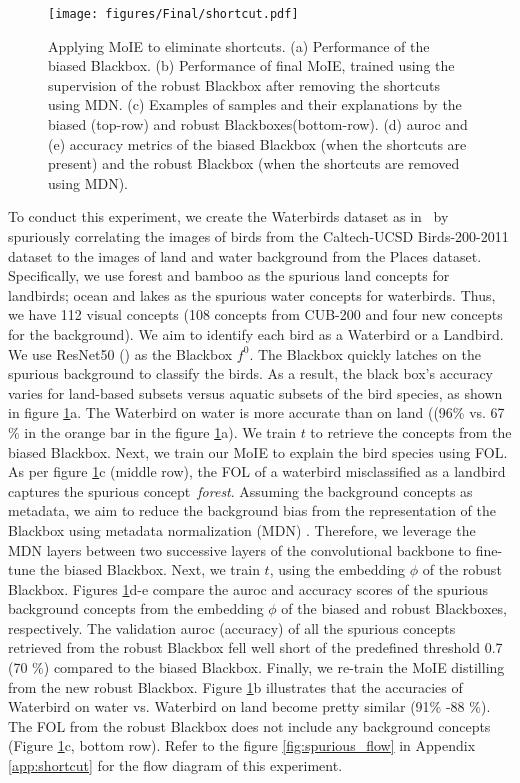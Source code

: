 \begin{figure}[t]
\centering
\texttt{[image: figures/Final/shortcut.pdf]}
\caption{Applying MoIE to eliminate shortcuts. (a) Performance of the biased Blackbox. 
(b) Performance of final MoIE, trained using the supervision of the robust Blackbox after removing the shortcuts using MDN. 
(c) Examples of samples and their explanations by the biased (top-row) and robust Blackboxes(bottom-row). 
(d) auroc and (e) accuracy metrics of the biased Blackbox (when the shortcuts are present) and the robust Blackbox (when the shortcuts are removed using MDN).
}
\label{fig:shortcut}
\end{figure}

To conduct this experiment, we create the Waterbirds dataset as in~\cite{sagawa2019dro} by spuriously correlating the images of birds from the Caltech-UCSD Birds-200-2011 dataset to the images of land and water background from the Places dataset. Specifically, we use forest and bamboo as the spurious land concepts for landbirds; ocean and lakes as the spurious water concepts for waterbirds. Thus, we have 112 visual concepts (108 concepts from CUB-200 and four new concepts for the background). We aim to identify each bird as a Waterbird or a Landbird. We use ResNet50 (\cite{he2016deep}) as the Blackbox $f^0$. The Blackbox quickly latches on the spurious background to classify the birds. As a result, the black box's accuracy varies for land-based subsets versus aquatic subsets of the bird species, as shown in figure \ref{fig:shortcut}a. The Waterbird on water is more accurate than on land ((96\%  vs. 67 \% in the orange bar in the figure \ref{fig:shortcut}a). We train $t$ to retrieve the concepts from the biased Blackbox. Next, we train our MoIE to explain the bird species using FOL. As per figure \ref{fig:shortcut}c (middle row), the FOL of a waterbird misclassified as a landbird captures the spurious concept \textit{forest}. Assuming the background concepts as metadata,  we aim to reduce the background bias from the representation of the Blackbox using metadata normalization (MDN) \cite{lu2021metadata}. Therefore, we leverage the MDN layers between two successive layers of the convolutional backbone to fine-tune the biased Blackbox. Next, we train $t$, using the embedding $\phi$ of the robust Blackbox. Figures \ref{fig:shortcut}d-e compare the auroc and accuracy scores of the spurious background concepts from the embedding $\phi$ of the biased and robust Blackboxes, respectively. The validation auroc (accuracy) of all the spurious concepts retrieved from the robust Blackbox fell well short of the predefined threshold 0.7 (70 \%) compared to the biased Blackbox. Finally, we re-train the MoIE distilling from the new robust Blackbox. Figure \ref{fig:shortcut}b illustrates that the accuracies of Waterbird on water vs. Waterbird on land become pretty similar (91\% -88 \%). The FOL from the robust Blackbox does not include any background concepts (Figure \ref{fig:shortcut}c, bottom row). Refer to the figure \ref{fig:spurious_flow} in Appendix \ref{app:shortcut} for the flow diagram of this experiment.